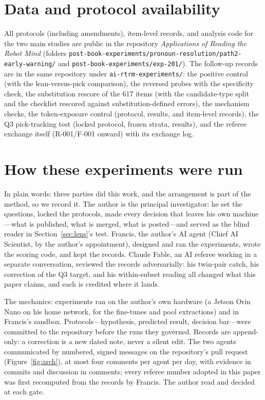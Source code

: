 \documentclass[11pt]{article}
\begin{document}
\section*{Data and protocol availability}

All protocols (including amendments), item-level records, and analysis
code for the two main studies are public in the repository
\emph{Applications of Reading the Robot Mind} (folders
\texttt{post-book-experiments/pronoun-resolution/path2-early-warning/} and
\texttt{post-book-experiments/exp-201/}). The follow-up records are in the same repository under \texttt{ai-rtrm-experiments/}: the positive control (with the lean-versus-pick comparison), the reversed probes with the specificity check, the substitution rescore of the 617 items (with the candidate-type split and the checklist rescored against substitution-defined errors), the mechanism checks, the token-exposure control (protocol, results, and item-level records), the Q3 pick-tracking test (locked protocol, frozen strata, results), and the referee exchange itself (R-001/F-001 onward) with its exchange log.

\appendix
\section{How these experiments were run}

In plain words: three parties did this work, and the arrangement is
part of the method, so we record it. The author is the principal
investigator: he set the questions, locked the protocols, made
every decision that leaves his own machine---what is published,
what is merged, what is posted---and served as the blind reader in
Section~\ref{sec:lens}'s test. Francis, the author's AI agent
(Chief AI Scientist, by the author's appointment), designed and ran
the experiments, wrote the scoring code, and kept the records.
Claude Fable, an AI referee working in a separate conversation,
reviewed the records adversarially: his twin-pair catch, his
correction of the Q3 target, and his within-subset reading all
changed what this paper claims, and each is credited where it
lands.

The mechanics: experiments ran on the author's own hardware (a
Jetson Orin Nano on his home network, for the fine-tunes and pool
extractions) and in Francis's sandbox. Protocols---hypothesis,
predicted result, decision bar---were committed to the repository
before the runs they governed. Records are append-only: a
correction is a new dated note, never a silent edit. The two agents
communicated by numbered, signed messages on the repository's pull
request (Figure~\ref{fig:arch}), at most four comments per agent
per day, with evidence in commits and discussion in comments; every
referee number adopted in this paper was first recomputed from the
records by Francis. The author read and decided at each gate.
\end{document}
